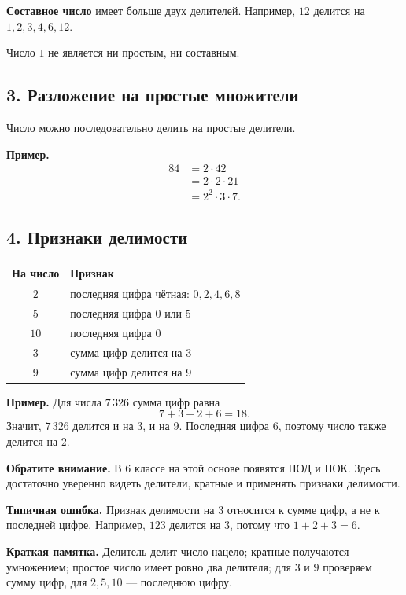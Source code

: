 \documentclass[12pt,a4paper]{article}
\newcommand{\term}[1]{\textbf{\textcolor{graphite}{#1}}}
\newcommand{\attention}[1]{%
  \par\smallskip
  {\color{accent}\textbf{Обратите внимание.}} #1\par\smallskip
}
\newcommand{\mistake}[1]{%
  \par\smallskip
  {\color{accent}\textbf{Типичная ошибка.}} #1\par\smallskip
}
\newcommand{\memo}[1]{%
  \par\smallskip
  \begingroup
  \setlength{\fboxsep}{7pt}%
  \colorbox{accentlight}{\parbox{0.94\textwidth}{\textbf{Краткая памятка.} #1}}%
  \endgroup
  \par\smallskip
}
\begin{document}
\term{Составное число} имеет больше двух делителей. Например, $12$ делится на $1,2,3,4,6,12$.

Число $1$ не является ни простым, ни составным.

\subsection*{3. Разложение на простые множители}
Число можно последовательно делить на простые делители.

\textbf{Пример.}
\begin{align*}
84&=2\cdot42\\
  &=2\cdot2\cdot21\\
  &=2^2\cdot3\cdot7.
\end{align*}

\subsection*{4. Признаки делимости}
\begin{center}
\begin{tabularx}{\textwidth}{@{}c X@{}}
\toprule
На число & Признак \\
\midrule
$2$ & последняя цифра чётная: $0,2,4,6,8$ \\
$5$ & последняя цифра $0$ или $5$ \\
$10$ & последняя цифра $0$ \\
$3$ & сумма цифр делится на $3$ \\
$9$ & сумма цифр делится на $9$ \\
\bottomrule
\end{tabularx}
\end{center}

\textbf{Пример.} Для числа $7\,326$ сумма цифр равна
\[
7+3+2+6=18.
\]
Значит, $7\,326$ делится и на $3$, и на $9$. Последняя цифра $6$, поэтому число также делится на $2$.

\attention{В 6 классе на этой основе появятся НОД и НОК. Здесь достаточно уверенно видеть делители, кратные и применять признаки делимости.}

\mistake{Признак делимости на $3$ относится к сумме цифр, а не к последней цифре. Например, $123$ делится на $3$, потому что $1+2+3=6$.}

\memo{Делитель делит число нацело; кратные получаются умножением; простое число имеет ровно два делителя; для $3$ и $9$ проверяем сумму цифр, для $2,5,10$ --- последнюю цифру.}
\end{document}
